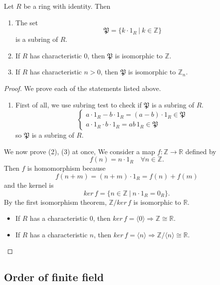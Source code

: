 \begin{theorem}
    Let $R$ be a ring with identity. Then 
    \begin{enumerate}
        \item The set 
        \[
            \mathfrak{P} = \{ k \cdot 1_R \> | \> k \in \mathbb{Z} \}
        \]
         is a subring of $R$.
        \item If $R$ has characteristic $0$, then $\mathfrak{P}$ is isomorphic to $\mathbb{Z}$.
        \item If $R$ has characteristic $n > 0$, then $\mathfrak{P}$ is isomorphic to $\mathbb{Z}_n$.
    \end{enumerate}
\end{theorem}
\begin{proof}
    We prove each of the statements listed above.
    \begin{enumerate}
        \item First of all, we use subring test to check if $\mathfrak{P}$ is a subring of $R$.
        \[
            \begin{cases}
                a \cdot 1_R - b \cdot 1_R = (a-b) \cdot 1_R \in \mathfrak{P}\\
                a \cdot 1_R \cdot b \cdot 1_R = ab\, 1_R \in \mathfrak{P}
            \end{cases}
        \]
        so $\mathfrak{P}$ is a subring of $R$. 
    \end{enumerate}

    We now prove (2), (3) at once, We consider a map $f : \mathbb{Z} \to \mathbb{R}$ 
    defined by 
    \[
        f(n) = n \cdot 1_R \quad \forall n \in \mathbb{Z}.
    \] 
    Then $f$ is homomorphism because 
    \[
        f(n + m) = (n + m) \cdot 1_R = f(n) + f(m)
    \]
    and the kernel is 
    \[
        ker\, f = \{ n \in \mathbb{Z} \> | \> n \cdot 1_R = 0_R \}.
    \]
    By the first isomorphism theorem, $\mathbb{Z} / ker\, f$ is isomorphic to $\mathbb{R}$.
    \begin{itemize}
        \item If $R$ has a characteristic $0$, then $ker\, f = \langle 0 \rangle \Longrightarrow \mathbb{Z} \cong \mathbb{R}$.
        \item If $R$ has a characteristic $n$, then $ker\, f = \langle n \rangle \Longrightarrow \mathbb{Z}/\langle n \rangle \cong \mathbb{R}$.
    \end{itemize}
\end{proof}

\subsection{Order of finite field}

